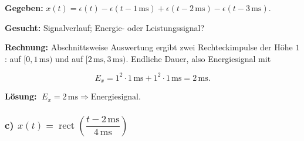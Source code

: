 \begin{beispiel}

\textbf{Gegeben:} $x(t) = \epsilon(t) - \epsilon(t-1\,\mathrm{ms})
+ \epsilon(t-2\,\mathrm{ms}) - \epsilon(t-3\,\mathrm{ms})$.

\textbf{Gesucht:} Signalverlauf; Energie- oder Leistungssignal?

\textbf{Rechnung:} Abschnittsweise Auswertung ergibt zwei Rechteckimpulse der
Höhe $1$: auf $[0,1\,\mathrm{ms})$ und auf $[2\,\mathrm{ms},3\,\mathrm{ms})$.
Endliche Dauer, also Energiesignal mit

$$
E_x = 1^2\cdot 1\,\mathrm{ms} + 1^2\cdot 1\,\mathrm{ms}
    = 2\,\mathrm{ms}.
$$

\begin{center}
\end{center}

\textbf{Lösung:} $\boxed{\;E_x = 2\,\mathrm{ms} \Rightarrow \text{Energiesignal.}\;}$

\end{beispiel}

\subsubsection*{c) $x(t) = \operatorname{rect}\!\left(\dfrac{t-2\,\mathrm{ms}}{4\,\mathrm{ms}}\right)$}

